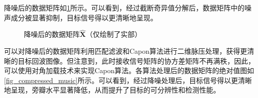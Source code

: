 \begin{solution}
    降噪后的数据矩阵如\cref{fig_denoised}所示。可以看到，经过截断奇异值分解后，数据矩阵中的噪声成分被显著抑制，目标信号得以更清晰地呈现。
    \begin{figure}[htb!]
        \centering
        \caption{降噪后的数据矩阵\( \hat{\mathbf{X}} \)（仅绘制了实部）}
        \label{fig_denoised}
    \end{figure}

    可以对降噪后的数据矩阵利用匹配滤波和Capon算法进行二维脉压处理，获得更清晰的目标回波图像。但注意到，此时接收信号矩阵的协方差矩阵不再满秩，因此，可以使用对角加载技术来实现Capon算法。各算法处理后的数据矩阵的绝对值图如\cref{fig_compressed_music}所示。可以看到，经过降噪处理后，目标信号得以更清晰地呈现，旁瓣水平显著降低，从而提升了目标的可分辨性和检测性能。


\end{solution}
